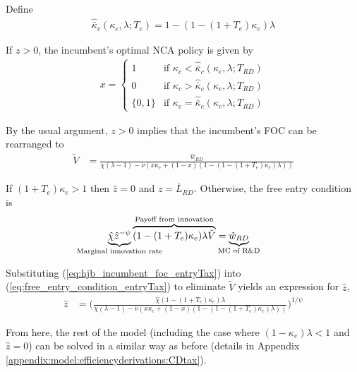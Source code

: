 \documentclass[11pt,english]{article}
\begin{document}
Define
\begin{align}
\hat{\bar{\kappa}}_c(\kappa_e,\lambda;T_e) = 1 - (1-(1+T_e)\kappa_e)\lambda  \label{eq:barkappa_entryTax}
\end{align} 

If $z > 0$, the incumbent's optimal NCA policy is given by 
\begin{align}
x = \begin{cases}
1 & \textrm{if } \kappa_{c} < \hat{\bar{\kappa}}_c (\kappa_e, \lambda;T_{RD}) \\
0 & \textrm{if } \kappa_{c} > \hat{\bar{\kappa}}_c (\kappa_e, \lambda;T_{RD})\\
\{0,1\} & \textrm{if } \kappa_c = \hat{\bar{\kappa}}_c (\kappa_e, \lambda;T_{RD})
\end{cases} \label{eq:nca_policy_entryTax}
\end{align}

By the usual argument, $z > 0$ implies that the incumbent's FOC can be rearranged to
\begin{align}
\tilde{V} &= \frac{\hat{w}_{RD}}{\chi(\lambda -1) - \nu (x\kappa_c + (1-x)(1 - (1-(1+T_e)\kappa_e)\lambda)) } \label{eq:hjb_incumbent_foc_entryTax}
\end{align}

If $(1 + T_e) \kappa_e > 1$ then $\hat{z} = 0$ and $z = \bar{L}_{RD}$. Otherwise, the free entry condition is
\begin{align}
\underbrace{\hat{\chi} \hat{z}^{-\psi}}_{\mathclap{\text{Marginal innovation rate}}} \overbrace{(1-(1+T_e)\kappa_e) \lambda \tilde{V}}^{\mathclap{\text{Payoff from innovation}}} &= \underbrace{\hat{w}_{RD}}_{\mathclap{\text{MC of R\&D}}} \label{eq:free_entry_condition_entryTax}
\end{align}

Substituting (\ref{eq:hjb_incumbent_foc_entryTax}) into (\ref{eq:free_entry_condition_entryTax}) to eliminate $\tilde{V}$ yields an expression for $\hat{z}$, 
\begin{align}
\hat{z} &= \Bigg( \frac{\hat{\chi} (1-(1+T_e)\kappa_{e}) \lambda}{\chi(\lambda -1) - \nu (x\kappa_c + (1-x)(1 - (1-(1+T_e)\kappa_e)\lambda)) } \Bigg)^{1/\psi} \label{eq:effort_entrant_entryTax}
\end{align}

From here, the rest of the model (including the case where $(1-\kappa_e)\lambda < 1$ and $\hat{z} = 0$) can be solved in a similar way as before (details in Appendix \ref{appendix:model:efficiencyderivations:CDtax}). 
\end{document}
